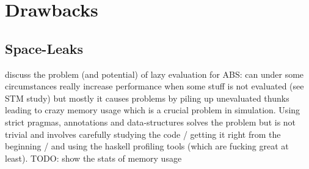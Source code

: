 \section{Drawbacks}

\subsection{Space-Leaks}
discuss the problem (and potential) of lazy evaluation for ABS: can under some circumstances really increase performance when some stuff is not evaluated (see STM study) but mostly it causes problems by piling up unevaluated thunks leading to crazy memory usage which is a crucial problem in simulation. Using strict pragmas, annotations and data-structures solves the problem but is not trivial and involves carefully studying the code / getting it right from the beginning / and using the haskell profiling tools (which are fucking great at least). TODO: show the stats of memory usage